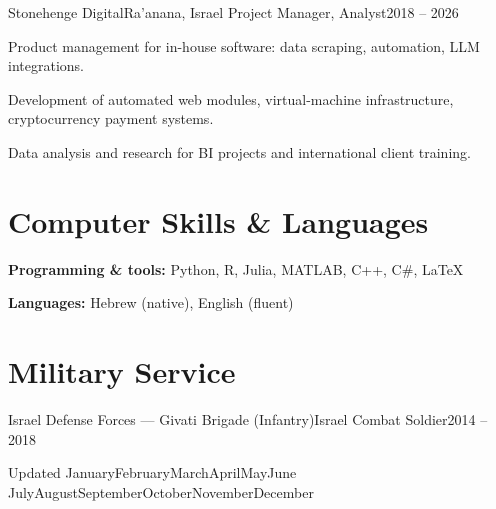 \documentclass[a4paper, 10pt]{article}
\begin{document}
\cventry
{Stonehenge Digital}{Ra'anana, Israel}
{Project Manager, Analyst}{2018 -- 2026}
\cvItems
\item Product management for in-house software: data scraping, automation, LLM integrations.
\item Development of automated web modules, virtual-machine infrastructure, cryptocurrency payment systems.
\item Data analysis and research for BI projects and international client training.
\cvItemsEnd

\section{Computer Skills \& Languages}
\cvPlain
\item \textbf{Programming \& tools:} Python, R, Julia, MATLAB, C++, C\#, LaTeX
\item \textbf{Languages:} Hebrew (native), English (fluent)
\cvPlainEnd

\section{Military Service}
\cventry
{Israel Defense Forces --- Givati Brigade (Infantry)}{Israel}
{Combat Soldier}{2014 -- 2018}

\vfill
\begin{center}\small Updated \ifcase\month\or January\or February\or March\or April\or May\or June\or
July\or August\or September\or October\or November\or December\fi\ \the\year\end{center}
\end{document}
